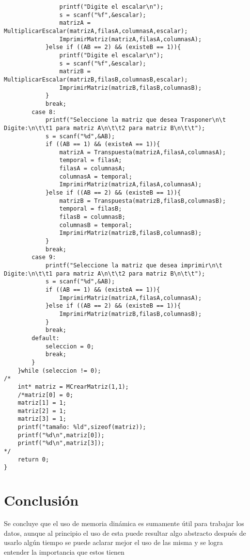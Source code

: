 \begin{verbatim}
                printf("Digite el escalar\n");
                s = scanf("%f",&escalar);
                matrizA = MultiplicarEscalar(matrizA,filasA,columnasA,escalar);
                ImprimirMatriz(matrizA,filasA,columnasA);
            }else if ((AB == 2) && (existeB == 1)){
                printf("Digite el escalar\n");
                s = scanf("%f",&escalar);
                matrizB = MultiplicarEscalar(matrizB,filasB,columnasB,escalar);
                ImprimirMatriz(matrizB,filasB,columnasB);
            }
            break;
        case 8:
            printf("Seleccione la matriz que desea Trasponer\n\t Digite:\n\t\t1 para matriz A\n\t\t2 para matriz B\n\t\t");
            s = scanf("%d",&AB);
            if ((AB == 1) && (existeA == 1)){
                matrizA = Transpuesta(matrizA,filasA,columnasA);
                temporal = filasA;
                filasA = columnasA;
                columnasA = temporal;
                ImprimirMatriz(matrizA,filasA,columnasA);
            }else if ((AB == 2) && (existeB == 1)){
                matrizB = Transpuesta(matrizB,filasB,columnasB);
                temporal = filasB;
                filasB = columnasB;
                columnasB = temporal;
                ImprimirMatriz(matrizB,filasB,columnasB);
            }
            break;      
        case 9:
            printf("Seleccione la matriz que desea imprimir\n\t Digite:\n\t\t1 para matriz A\n\t\t2 para matriz B\n\t\t");
            s = scanf("%d",&AB);
            if ((AB == 1) && (existeA == 1)){
                ImprimirMatriz(matrizA,filasA,columnasA);
            }else if ((AB == 2) && (existeB == 1)){
                ImprimirMatriz(matrizB,filasB,columnasB);
            }
            break;
        default:
            seleccion = 0;
            break;
        }
    }while (seleccion != 0);
/*
    int* matriz = MCrearMatriz(1,1);
    /*matriz[0] = 0;
    matriz[1] = 1;
    matriz[2] = 1;
    matriz[3] = 1;
    printf("tamaño: %ld",sizeof(matriz));
    printf("%d\n",matriz[0]);
    printf("%d\n",matriz[3]);
*/
    return 0;
}
\end{verbatim}


%



\newpage	
\section{Conclusión}
Se concluye que el uso de memoria dinámica es sumamente útil para trabajar los datos, aunque al principio el uso de esta puede resultar algo abstracto después de usarlo algún tiempo se puede aclarar mejor el uso de las misma y se logra entender la importancia que estos tienen



